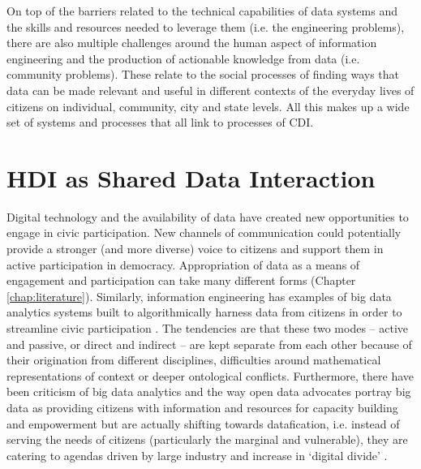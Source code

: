On top of the barriers related to the technical capabilities of data systems and the skills and resources needed to leverage them (i.e. the engineering problems), there are also multiple challenges around the human aspect of information engineering and the production of actionable knowledge from data (i.e. community problems). These relate to the social processes of finding ways that data can be made relevant and useful in different contexts of the everyday lives of citizens on individual, community, city and state levels. All this makes up a wide set of systems and processes that all link to processes of CDI.

\section{HDI as Shared Data Interaction}
Digital technology and the availability of data have created new opportunities to engage in civic participation. New channels of communication could potentially provide a stronger (and more diverse) voice to citizens and support them in active participation in democracy. Appropriation of data as a means of engagement and participation can take many different forms (Chapter \ref{chap:literature}). Similarly, information engineering has examples of big data analytics systems built to algorithmically harness data from citizens in order to streamline civic participation \citep{tenney_data-driven_2016}. The tendencies are that these two modes -- active and passive, or direct and indirect -- are kept separate from each other because of their origination from different disciplines, difficulties around mathematical representations of context or deeper ontological conflicts. Furthermore, there have been criticism of big data analytics and the way open data advocates portray big data as providing citizens with information and resources for capacity building and empowerment but are actually shifting towards datafication, i.e. instead of serving the needs of citizens (particularly the marginal and vulnerable), they are catering to agendas driven by large industry \citep{chandler_world_2015,michael_toward_2016,tenney_data-driven_2016} and increase in `digital divide' \citep{gurstein_effective_2003}.

